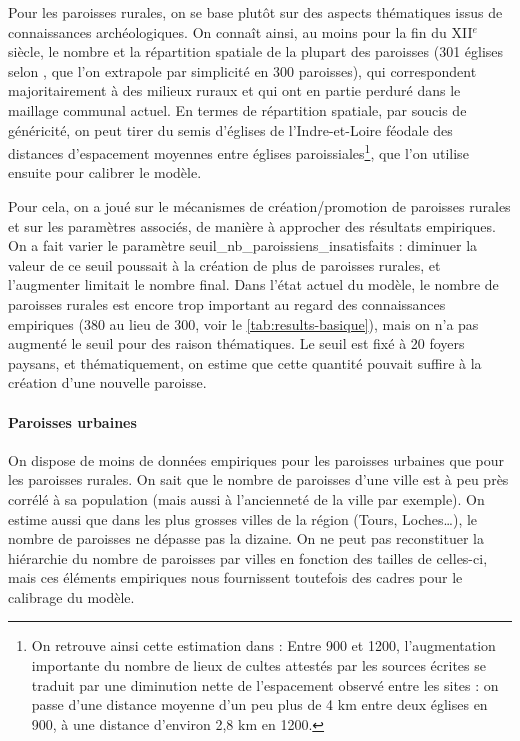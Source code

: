 Pour les paroisses \og rurales\fg{}, on se base plutôt sur des aspects thématiques issus de connaissances archéologiques.
On connaît ainsi, au moins pour la fin du XII$^e$ siècle, le nombre et la répartition spatiale de la plupart des paroisses (301 églises selon \textcite[31]{zadora-rio_paroisses_2008}, que l'on extrapole par simplicité en 300 paroisses), qui correspondent majoritairement à des milieux ruraux et qui ont en partie perduré dans le maillage communal actuel.
En termes de répartition spatiale, par soucis de généricité, on peut tirer du semis d'églises de l'Indre-et-Loire féodale des distances d'espacement moyennes entre églises paroissiales\footnote{
	On retrouve ainsi cette estimation dans \textcite[261]{chareille_dynamiques_2008} : \og Entre 900 et 1200, l'augmentation importante du nombre de lieux de cultes attestés par les sources écrites se traduit par une diminution nette de l'espacement observé entre les sites : on passe d'une distance moyenne d'un peu plus de 4 km entre deux églises en 900, à une distance d'environ 2,8 km en 1200.\fg{}
}, que l'on utilise ensuite pour calibrer le modèle.

Pour cela, on a joué sur le mécanismes de création/promotion de paroisses rurales et sur les paramètres associés, de manière à approcher des résultats empiriques.
On a fait varier le paramètre \textsf{seuil\_nb\_paroissiens\_insatisfaits} : diminuer la valeur de ce seuil poussait à la création de plus de paroisses rurales, et l'augmenter limitait le nombre final.
Dans l'état actuel du modèle, le nombre de paroisses rurales est encore trop important au regard des connaissances empiriques (380 au lieu de 300, voir le \vref{tab:results-basique}), mais on n'a pas augmenté le seuil pour des raison thématiques.
Le seuil est fixé à 20 foyers paysans, et thématiquement, on estime que cette quantité pouvait suffire à la création d'une nouvelle paroisse.

\paragraph{Paroisses \og urbaines\fg{}}

On dispose de moins de données empiriques pour les paroisses urbaines que pour les paroisses rurales.
On sait que le nombre de paroisses d'une ville est à peu près corrélé à sa population (mais aussi à l'ancienneté de la ville par exemple).
On estime aussi que dans les plus grosses villes de la région (Tours, Loches\ldots), le nombre de paroisses ne dépasse pas la dizaine.
On ne peut pas reconstituer la hiérarchie du nombre de paroisses par villes en fonction des tailles de celles-ci, mais ces éléments empiriques nous fournissent toutefois des cadres pour le calibrage du modèle.

